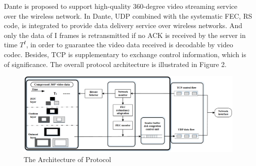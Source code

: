 Dante is proposed to support high-quality 360-degree video
streaming service over the wireless network. In Dante, UDP combined with the systematic FEC, RS code, is integrated to provide data delivery service over wireless networks. And only the data of I frames is retransmitted if no ACK is received by the server in time ${T^I}$, in order to guarantee the video data received is decodable by video codec.
Besides, TCP is supplementary to exchange control information, which is of significance. The overall protocol architecture is illustrated in Figure 2.

\begin{figure}[ht]
	\centering
	\includegraphics[scale=0.4]{paper_figs/architecture_simple_0624_v7.png}
	\caption{The Architecture of Protocol}
	\label{paper_figs:pathdemo}
\end{figure}
